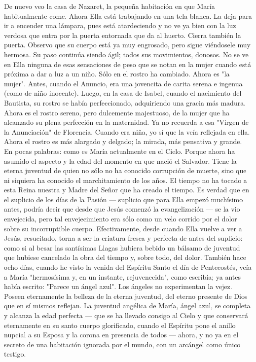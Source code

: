 \documentclass[12pt]{book} %
\begin{document}
De nuevo veo la casa de Nazaret, la pequeña habitación en que María habitualmente come. Ahora Ella está trabajando 
en una tela blanca. La deja para ir a encender una lámpara, pues está atardeciendo y no ve ya bien con la luz verdosa que entra por la puerta entornada que da al huerto. Cierra también la puerta. 
Observo que su cuerpo está ya muy engrosado, pero sigue viéndosele muy hermosa. Su paso continúa siendo ágil; todos sus movimientos, donosos. No se ve en Ella ninguna de esas sensaciones de peso que se notan en la mujer cuando está próxima a dar a luz a un niño. Sólo en el rostro ha cambiado. Ahora es "la mujer". Antes, cuando el Anuncio, era una jovencita de carita serena e ingenua (como de niño inocente). Luego, en la casa de Isabel, cuando el nacimiento del Bautista, su rostro se había perfeccionado, adquiriendo una gracia más madura. Ahora es el rostro sereno, pero dulcemente majestuoso, de la mujer que ha alcanzado su plena perfección en la maternidad. 
Ya no recuerda a esa "Virgen de la Anunciación" de Florencia. Cuando era niña, yo sí que la veía reflejada en ella. Ahora el rostro es más alargado y delgado; la mirada, más pensativa y grande. En pocas palabras: como es María actualmente en el Cielo. Porque ahora ha asumido el aspecto y la edad del momento en que nació el Salvador. 
Tiene la eterna juventud de quien no sólo no ha conocido corrupción de muerte, sino que ni siquiera ha conocido el marchitamiento de los años. El tiempo no ha tocado a esta Reina nuestra y Madre del Señor que ha creado el tiempo. Es verdad que en el suplicio de los días de la Pasión — suplicio que para Ella empezó muchísimo antes, podría decir que desde que Jesús comenzó la evangelización — se la vio envejecida, pero tal envejecimiento era sólo como un velo corrido por el dolor sobre su incorruptible cuerpo. Efectivamente, desde cuando Ella vuelve a ver a Jesús, resucitado, torna a ser la criatura fresca y perfecta de antes del suplicio: como si al besar las santísimas Llagas hubiera bebido un bálsamo de juventud que hubiese cancelado la obra del tiempo y, sobre todo, del dolor. También hace ocho días, cuando he visto la venida del Espíritu Santo el día de Pentecostés, veía a María "hermosísima y, en un instante, rejuvenecida", como escribía; ya antes había escrito: "Parece un ángel azul". Los ángeles no experimentan la vejez. Poseen eternamente la belleza de la eterna juventud, del eterno presente de Dios que en sí mismos reflejan. 
La juventud angélica de María, ángel azul, se completa y alcanza la edad perfecta — que se ha llevado consigo al Cielo y 
que conservará eternamente en su santo cuerpo glorificado, cuando el Espíritu pone el anillo nupcial a su Esposa y la corona en presencia de todos — ahora, y no ya en el secreto de una habitación ignorada por el mundo, con un arcángel como único testigo. 
\end{document}
